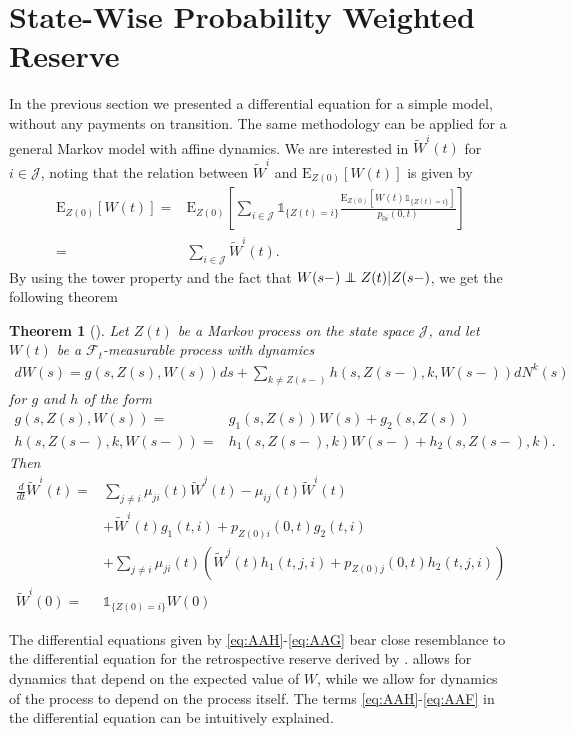 \documentclass[12pt]{article}
\newcommand{\E}{\text{E}}
\newcommand{\indic}[1]{\mathds{1}_{ \{ #1 \} }}
\newcommand\independent{\protect\mathpalette{\protect\independenT}{\perp}}
\def\independenT#1#2{\mathrel{\rlap{$#1#2$}\mkern2mu{#1#2}}}
\theoremstyle{my_thm}
\newtheorem{thm}{Theorem}[section]
\begin{document}
\section{State-Wise Probability Weighted Reserve}
In the previous section we presented a differential equation for a simple model, without any payments on transition. The same methodology can be applied for a general Markov model with affine dynamics. We are interested in $\tilde{W}^i(t)$ for $i \in \mathcal{J}$, noting that the relation between $\tilde{W}^i$ and $\E_{Z(0)}[W(t)]$ is given by
\begin{align*}
\E_{Z(0)}[W(t)] =&
\E_{Z(0)} \left[ \sum_{i\in \mathcal{J}} \indic{Z(t)=i} \frac{\E_{Z(0)}[W(t)\indic{Z(t)=i}]}{p_{0i}(0,t)} \right]
\\
=&
\sum_{i\in \mathcal{J}} \tilde{W}^i(t).
\end{align*}
By using the tower property and the fact that $W(s-)\independent Z(t)|Z(s-)$, we get the following theorem
\begin{thm}[]
\label{thm:Diff_1}
Let $Z(t)$ be a Markov process on the state space $\mathcal{J}$, and let $W(t)$ be a $\mathcal{F}_t$-measurable process with dynamics
\begin{align*}
dW(s)=  g(s,Z(s),W(s))ds+
 \sum_{k \neq Z(s-)} h(s,Z(s-),k,W(s-)) dN^k(s) 
\end{align*}
for $g$ and $h$ of the form
\begin{align*}
g(s,Z(s),W(s))=&g_1(s,Z(s)) W(s)+g_2(s,Z(s))
\\
h(s,Z(s-),k,W(s-))=&h_1(s,Z(s-),k) W(s-)+h_2(s,Z(s-),k).
\end{align*}
Then
\begin{align}
\frac{d}{dt}\tilde{W}^i(t)=&
\sum_{j \neq i} \mu_{ji}(t) \tilde{W}^j(t)-\mu_{ij}(t)\tilde{W}^i(t)
 \label{eq:AAH} \\
&+
\tilde{W}^i(t)g_1(t,i)+p_{Z(0)i}(0,t)g_2(t,i)
 \label{eq:AAI}\\
&+
\sum_{j\neq i} \mu_{ji}(t) \left( \tilde{W}^j(t) h_1(t,j,i)+ p_{Z(0)j}(0,t)h_2(t,j,i)\right) \label{eq:AAF}
\\
\tilde{W}^i(0)=&\indic{Z(0)=i}W(0) \label{eq:AAG}
\end{align}
\end{thm}
The differential equations given by \eqref{eq:AAH}-\eqref{eq:AAG} bear close resemblance to the differential equation for the retrospective reserve derived by \citet{Norberg}. \citet{Norberg} allows for dynamics that depend on the expected value of $W$, while we allow for dynamics of the process to depend on the process itself. The terms \eqref{eq:AAH}-\eqref{eq:AAF} in the differential equation can be intuitively explained.
\end{document}
